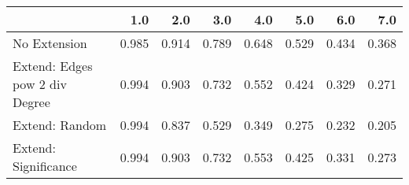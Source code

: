 \begin{tabular}{lrrrrrrr}
\toprule
{} &   1.0 &   2.0 &   3.0 &   4.0 &   5.0 &   6.0 &   7.0 \\
\midrule
No Extension                   & 0.985 & 0.914 & 0.789 & 0.648 & 0.529 & 0.434 & 0.368 \\
Extend: Edges pow 2 div Degree & 0.994 & 0.903 & 0.732 & 0.552 & 0.424 & 0.329 & 0.271 \\
Extend: Random                 & 0.994 & 0.837 & 0.529 & 0.349 & 0.275 & 0.232 & 0.205 \\
Extend: Significance           & 0.994 & 0.903 & 0.732 & 0.553 & 0.425 & 0.331 & 0.273 \\
\bottomrule
\end{tabular}
